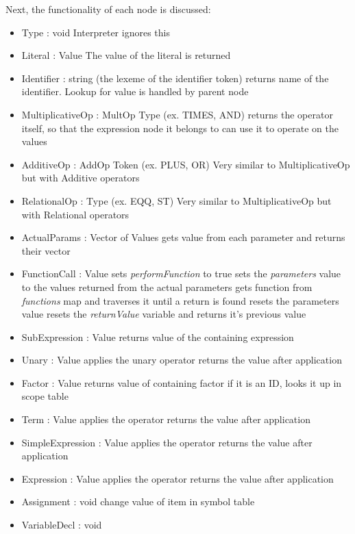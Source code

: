 Next, the functionality of each node is discussed:
\begin{itemize}
	\item Type : void
		\subitem Interpreter ignores this
	\item Literal : Value
		\subitem The value of the literal is returned
	\item Identifier : string (the lexeme of the identifier token)
		\subitem returns name of the identifier. Lookup for value is handled by parent node
	\item MultiplicativeOp : MultOp Type (ex. TIMES, AND)
		\subitem returns the operator itself, so that the expression node it belongs to can use it to operate on the values
	\item AdditiveOp : AddOp Token (ex. PLUS, OR)
		\subitem Very similar to MultiplicativeOp but with Additive operators
	\item RelationalOp : Type (ex. EQQ, ST)
		\subitem Very similar to MultiplicativeOp but with Relational operators
	\item ActualParams : Vector of Values
		\subitem gets value from each parameter and returns their vector
	\item FunctionCall : Value
		\subitem sets \textit{performFunction} to true
		\subitem sets the \textit{parameters} value to the values returned from the actual parameters
		\subitem gets function from \textit{functions} map and traverses it until a return is found
		\subitem resets the parameters value
		\subitem resets the \textit{returnValue} variable and returns it's previous value
	\item SubExpression : Value
		\subitem returns value of the containing expression
	\item Unary : Value
		\subitem applies the unary operator
		\subitem returns the value after application
	\item Factor : Value
		\subitem returns value of containing factor
		\subitem if it is an ID, looks it up in scope table
	\item Term : Value
		\subitem applies the operator
		\subitem returns the value after application
	\item SimpleExpression : Value
		\subitem applies the operator
		\subitem returns the value after application
	\item Expression : Value
		\subitem applies the operator
		\subitem returns the value after application
	\item Assignment : void
		\subitem change value of item in symbol table
	\item VariableDecl : void

\end{itemize}
